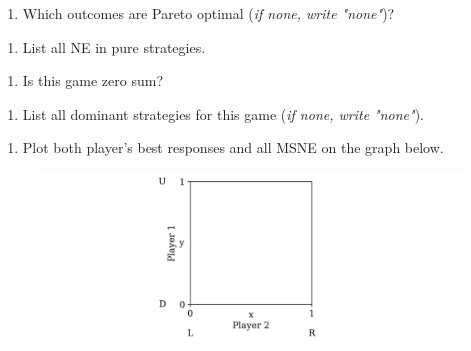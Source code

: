 \documentclass[11pt]{article}
\begin{document}
\begin{enumerate}[label=\alph*), start=1]
\item  Which outcomes are Pareto optimal (\textit{if none, write "none"})? \hfill \raisebox{-1ex}{\rule{4.2cm}{1pt}}

\end{enumerate}
\begin{enumerate}[label=\alph*), start=2]
\item  List all NE in pure strategies. \hfill \raisebox{-1ex}{\rule{4.2cm}{1pt}}

\end{enumerate}
\begin{enumerate}[label=\alph*), start=3]
\item  Is this game zero sum? \hfill \raisebox{-1ex}{\rule{4.2cm}{1pt}}

\end{enumerate}
\begin{enumerate}[label=\alph*), start=4]
\item  List all dominant strategies for this game (\textit{if none, write "none"}). \hfill \raisebox{-1ex}{\rule{4.2cm}{1pt}}

\end{enumerate}
\begin{enumerate}[label=\alph*), start=5]
\item  Plot both player’s best responses and all MSNE on the graph below.

\end{enumerate}

\begin{figure}[h!]
\centering
\includegraphics[width=\textwidth]{Images/mixed_strategy_graph.png}
\end{figure}

\pagebreak
\end{document}
